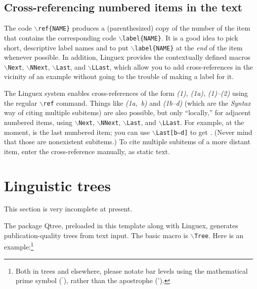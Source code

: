 \documentclass[letterpaper,12pt, twoside]{article}
\begin{document}
\subsection{Cross-referencing numbered items in the text}\label{seccross}

The code \texttt{$\backslash$ref\{NAME\}} produces a (parenthesized) copy of the number of the item that contains the corresponding code \texttt{$\backslash$label\{NAME\}}. It is a good idea to pick short, descriptive label names and to put \texttt{$\backslash$label\{NAME\}} at the \emph{end} of the item whenever possible. In addition, {Linguex} provides the contextually defined macros \texttt{$\backslash$Next}, \texttt{$\backslash$NNext}, \texttt{$\backslash$Last}, and \texttt{$\backslash$LLast}, which allow you to add cross-references in the vicinity of an example without going to the trouble of making a label for it. 

The {Linguex} system enables cross-references of the form \emph{(1), (1a), (1)--(2)}  using the regular \texttt{$\backslash$ref{}} command. Things like \emph{(1a,~b)} and \emph{(1b--d)}  (which are the \emph{Syntax} way of citing multiple subitems) are also possible, but only ``locally,'' for adjacent numbered items, using  \texttt{$\backslash$Next}, \texttt{$\backslash$NNext}, \texttt{$\backslash$Last}, and \texttt{$\backslash$LLast}. For example, at the moment, \Last is the last numbered item; you can use \texttt{$\backslash$Last[b--d]} to get \emph{\Last[b--d]}. (Never mind that those are nonexistent subitems.) To cite multiple subitems of a more distant item, enter the cross-reference manually, as static text.







\section{Linguistic trees}\label{sectrees}
This section is very incomplete at present.

The package {Qtree}, preloaded in this template along with {Linguex}, generates publication-quality trees from text input. The basic macro is \texttt{$\backslash$Tree}. Here is an example:\footnote{Both in trees and elsewhere, please notate bar levels using the mathematical prime symbol ($^\prime$), rather than the apostrophe (').\label{noteprime}}
\end{document}
